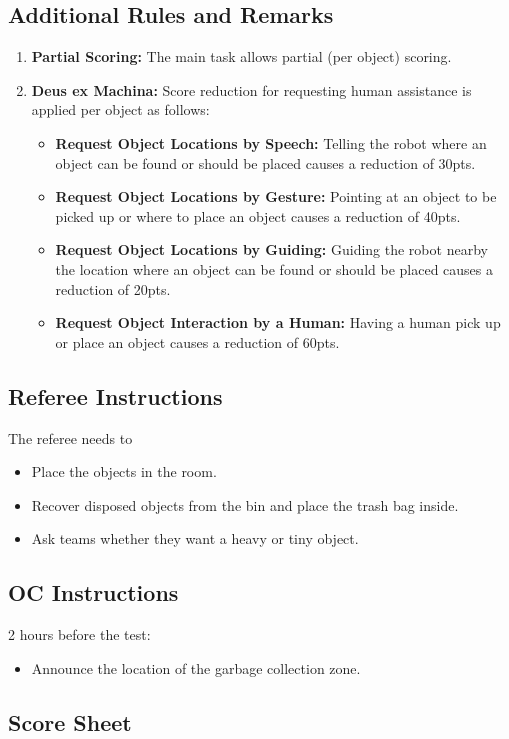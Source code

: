 \subsection*{Additional Rules and Remarks}
\begin{enumerate}[nosep]
	\item \textbf{Partial Scoring:} The main task allows partial (per object) scoring.
	
	\item \textbf{Deus ex Machina:} Score reduction for requesting human assistance is applied per object as follows:
	\begin{itemize}[nosep]
		\item \textbf{Request Object Locations by Speech:} Telling the robot where an object can be found or should be placed causes a reduction of 30pts.
		
		\item \textbf{Request Object Locations by Gesture:} Pointing at an object to be picked up or where to place an object causes a reduction of 40pts.
		
		\item \textbf{Request Object Locations by Guiding:} Guiding the robot nearby the location where an object can be found or should be placed causes a reduction of 20pts.
		
		\item \textbf{Request Object Interaction by a Human:} Having a human pick up or place an object causes a reduction of 60pts.
	\end{itemize}
\end{enumerate}

\newpage

\subsection*{Referee Instructions}
The referee needs to
\begin{itemize}
	\item Place the objects in the room.
	\item Recover disposed objects from the bin and place the trash bag inside.
	\item Ask teams whether they want a heavy or tiny object.
\end{itemize}

\subsection*{OC Instructions}
2 hours before the test:
\begin{itemize}
	\item Announce the location of the garbage collection zone.
\end{itemize}

\subsection*{Score Sheet}

